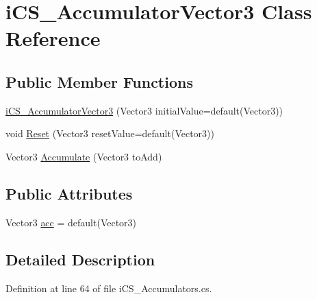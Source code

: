 \hypertarget{classi_c_s___accumulator_vector3}{\section{i\+C\+S\+\_\+\+Accumulator\+Vector3 Class Reference}
\label{classi_c_s___accumulator_vector3}
}
\subsection*{Public Member Functions}
\begin{DoxyCompactItemize}
\item 
\hyperlink{classi_c_s___accumulator_vector3_ab953f1d630502811ad432146e1e03f43}{i\+C\+S\+\_\+\+Accumulator\+Vector3} (Vector3 initial\+Value=default(Vector3))
\item 
void \hyperlink{classi_c_s___accumulator_vector3_a3344256bbd31a418b49b3a32588cf60c}{Reset} (Vector3 reset\+Value=default(Vector3))
\item 
Vector3 \hyperlink{classi_c_s___accumulator_vector3_a41d0c92da04f747d9de53fea755b7786}{Accumulate} (Vector3 to\+Add)
\end{DoxyCompactItemize}
\subsection*{Public Attributes}
\begin{DoxyCompactItemize}
\item 
Vector3 \hyperlink{classi_c_s___accumulator_vector3_a583bb8a0464ce5e15a37437c45c4d475}{acc} = default(Vector3)
\end{DoxyCompactItemize}


\subsection{Detailed Description}


Definition at line 64 of file i\+C\+S\+\_\+\+Accumulators.\+cs.



